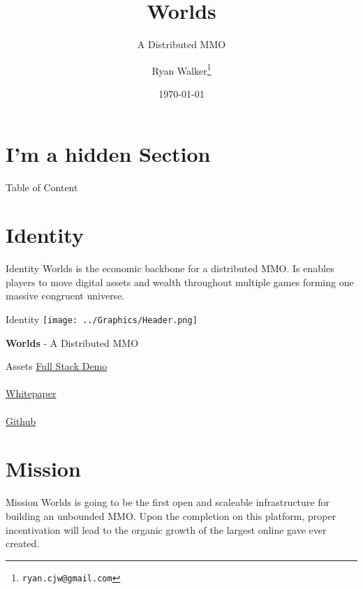 \documentclass[final, ngerman, xcolor=pdftex, dvipsnames, table, aspectratio=169, 14pt]{beamer}
\begin{document}
\title[Worlds]{Worlds}
\subtitle[]{A Distributed MMO}
\author[]{Ryan Walker\footnote{\texttt{ryan.cjw@gmail.com}}}
\date{\today} %


\begin{frame}
  \maketitle
\end{frame}

\section*{I'm a hidden Section}
\begin{frame}{Table of Content} %
    \tableofcontents
\end{frame}

\section{Identity}

\begin{frame}{Identity}
Worlds is the economic backbone for a distributed MMO. Is enables players to move digital assets and wealth throughout multiple games forming one massive congruent universe. 
\end{frame}

\begin{frame}{Identity}
\centering
\texttt{[image: ../Graphics/Header.png]} 

\textbf{Worlds} - A Distributed MMO
\end{frame}

\begin{frame}{Assets}
\href{https://www.youtube.com/watch?v=OrOZVr-j92A}{Full Stack Demo}
\\~\\

\href{https://github.com/Machine-Hum/Worlds/raw/master/Worlds-Whitepaper/whitepaper.pdf}{Whitepaper}
\\~\\

\href{worldsmmo.com}{Github}
\end{frame}

\section{Mission}
\begin{frame}{Mission}
Worlds is going to be the first open and scaleable infrastructure for building an unbounded MMO. Upon the completion on this platform, proper incentivation will lead to the organic growth of the largest online gave ever created.
\end{frame}
\end{document}
